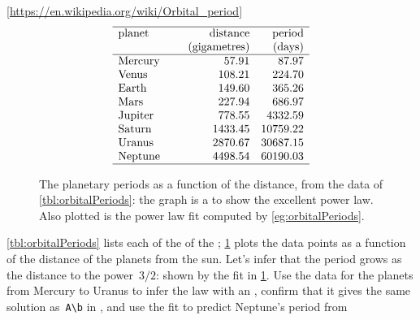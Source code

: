 \begin{example} \label{eg:orbitalPeriods}
\begin{table}
\caption{Orbital periods for the eight  of the : the periods are in (Earth) days; the distance is the length of the semi-major axis of the orbits (, 2014).
Used by \cref{eg:orbitalPeriods}.}
\label{tbl:orbitalPeriods}
{\footnotesize[\protect\url{https://en.wikipedia.org/wiki/Orbital\_period}]}
\begin{equation*}
\begin{array}{p{12ex}rr} \hline
planet&\text{distance}&\text{period}\\
&\text{(gigametres)}&\text{(days)}\\\hline
Mercury& 57.91 & 87.97 \\
Venus& 108.21 & 224.70 \\
Earth& 149.60& 365.26\\
Mars& 227.94& 686.97\\
Jupiter& 778.55& 4332.59\\
Saturn& 1433.45& 10759.22\\
Uranus& 2870.67& 30687.15\\
Neptune& 4498.54& 60190.03\\\hline
\end{array}
\end{equation*}
\end{table}%
\begin{figure}
\centering

\caption{The planetary periods as a function of the distance, from the data of \cref{tbl:orbitalPeriods}: the graph is a  to show the excellent power law.  
Also plotted is the power law fit computed by \cref{eg:orbitalPeriods}.}
\label{fig:orbitalPeriods}
\end{figure}%
\cref{tbl:orbitalPeriods} lists each  of the  of the ; \cref{fig:orbitalPeriods} plots the data points as a function of the distance of the planets from the sun.
Let's infer  that the period grows as the distance to the power~\(3/2\): shown by the  fit in \cref{fig:orbitalPeriods}.
Use the data for the planets from Mercury to Uranus to infer the law with an \svd, confirm that it gives the same solution as~\verb|A\b| in \script, and use the fit to predict Neptune's period from 
\begin{solution} 

\end{solution}
\end{example}
